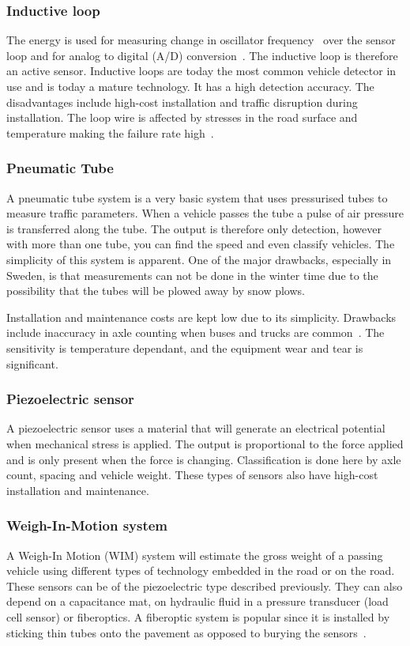 \subsubsection{Inductive loop}
The energy is used for measuring change in oscillator frequency~\cite{path2007} over the sensor loop and for analog to digital (A/D) conversion~\cite{cheung2005-2}. The inductive loop is therefore an active sensor. Inductive loops are today the most common vehicle detector in use and is today a mature technology. It has a high detection accuracy. The disadvantages include high-cost installation and traffic disruption during installation. The loop wire is affected by stresses in the road surface and temperature making the failure rate high~\cite{path2007}.

\subsubsection{Pneumatic Tube}
A pneumatic tube system is a very basic system that uses pressurised tubes to measure traffic parameters. When a vehicle passes the tube a pulse of air pressure is transferred along the tube. The output is therefore only detection, however with more than one tube, you can find the speed and even classify vehicles. The simplicity of this system is apparent. One of the major drawbacks, especially in Sweden, is that measurements can not be done in the winter time due to the possibility that the tubes will be plowed away by snow plows.

Installation and maintenance costs are kept low due to its simplicity. Drawbacks include inaccuracy in axle counting when buses and trucks are common~\cite{path2007}. The sensitivity is temperature dependant, and the equipment wear and tear is significant. 

\subsubsection{Piezoelectric sensor}
A piezoelectric sensor uses a material that will generate an electrical potential when mechanical stress is applied. The output is proportional to the force applied and is only present when the force is changing. Classification is done here by axle count, spacing and vehicle weight. These types of sensors also have high-cost installation and maintenance. 

\subsubsection{Weigh-In-Motion system}
A Weigh-In Motion (WIM) system will estimate the gross weight of a passing vehicle using different types of technology embedded in the road or on the road. These sensors can be of the piezoelectric type described previously. They can also depend on a capacitance mat, on hydraulic fluid in a pressure transducer (load cell sensor) or fiberoptics. A fiberoptic system is popular since it is installed by sticking thin tubes onto the pavement as opposed to burying the sensors~\cite{path2007}.

